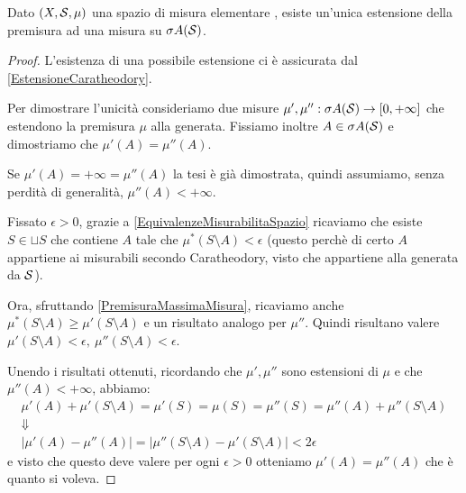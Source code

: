 \begin{proposition}
	Dato $(X,\S,\mu)$ una spazio di misura elementare \sigfin[o], esiste un'unica estensione della premisura ad una misura su $\sigma A(\S)$.
\end{proposition}
\begin{proof}
	L'esistenza di una possibile estensione ci è assicurata dal \cref{EstensioneCaratheodory}.
	
	Per dimostrare l'unicità consideriamo due misure $\mu',\mu'':\sigma A(\S)\to\Rpiu$ che estendono la premisura $\mu$ alla \sigalg{} generata. Fissiamo inoltre $A\in\sigma A(\S)$ e dimostriamo che $\mu'(A)=\mu''(A)$.
	
	Se $\mu'(A)=+\infty=\mu''(A)$ la tesi è già dimostrata,  quindi assumiamo, senza perdità di generalità, $\mu''(A)<+\infty$.
	
	Fissato $\epsilon>0$, grazie a \cref{EquivalenzeMisurabilitaSpazio} ricaviamo che esiste $S\in\sqcup S$ che contiene $A$ tale che $\mu^*(S\setminus A)< \epsilon$ (questo perchè di certo $A$ appartiene ai misurabili secondo Caratheodory, visto che appartiene alla \sigalg{} generata da $\S$).
	
	Ora, sfruttando \cref{PremisuraMassimaMisura}, ricaviamo anche $\mu^*(S\setminus A)\ge\mu'(S\setminus A)$ e un risultato analogo per $\mu''$. Quindi risultano valere $\mu'(S\setminus A)<\epsilon,\ \mu''(S\setminus A)<\epsilon$.
	
	Unendo i risultati ottenuti, ricordando che $\mu',\mu''$ sono estensioni di $\mu$ e che $\mu''(A)<+\infty$,  abbiamo:
	\begin{gather*}
		\mu'(A)+\mu'(S\setminus A)=\mu'(S)=\mu(S)=\mu''(S)=\mu''(A)+\mu''(S\setminus A) \\
		\Downarrow \\
		\lvert\mu'(A)-\mu''(A)\rvert=\lvert\mu''(S\setminus A)-\mu'(S\setminus A)\rvert<2\epsilon
	\end{gather*}
	e visto che questo deve valere per ogni $\epsilon>0$ otteniamo $\mu'(A)=\mu''(A)$ che è quanto si voleva.
\end{proof}

